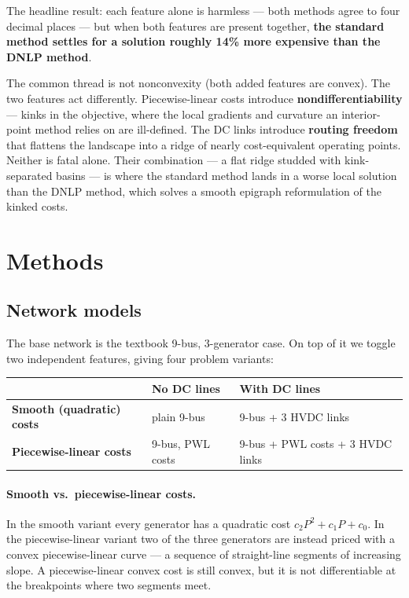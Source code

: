 \documentclass[11pt]{article}
\begin{document}
The headline result: each feature alone is harmless --- both methods
agree to four decimal places --- but when both features are present together,
\textbf{the standard method settles for a solution roughly 14\% more expensive than the
DNLP method}.

The common thread is not nonconvexity (both added features are
convex). The two features act differently. Piecewise-linear costs introduce
\textbf{nondifferentiability} --- kinks in the objective, where the local
gradients and curvature an interior-point method relies on are ill-defined. The
DC links introduce \textbf{routing freedom} that flattens the landscape into a
ridge of nearly cost-equivalent operating points. Neither is fatal alone. Their
combination --- a flat ridge studded with kink-separated basins --- is where the
standard method lands in a worse local solution than the DNLP method, which
solves a smooth epigraph reformulation of the kinked costs.

\section{Methods}

\subsection{Network models}

The base network is the textbook 9-bus, 3-generator case. On top of it we toggle
two independent features, giving four problem variants:

\begin{center}
\begin{tabular}{lll}
\toprule
 & \textbf{No DC lines} & \textbf{With DC lines} \\
\midrule
\textbf{Smooth (quadratic) costs} & plain 9-bus & 9-bus + 3 HVDC links \\
\textbf{Piecewise-linear costs} & 9-bus, PWL costs & 9-bus + PWL costs + 3 HVDC links \\
\bottomrule
\end{tabular}
\end{center}

\paragraph{Smooth vs.\ piecewise-linear costs.} In the smooth variant every
generator has a quadratic cost $c_2 P^2 + c_1 P + c_0$. In the piecewise-linear
variant two of the three generators are instead priced with a convex
piecewise-linear curve --- a sequence of straight-line segments of increasing
slope. A piecewise-linear convex cost is still convex, but it is
not differentiable at the breakpoints where two segments meet.
\end{document}
